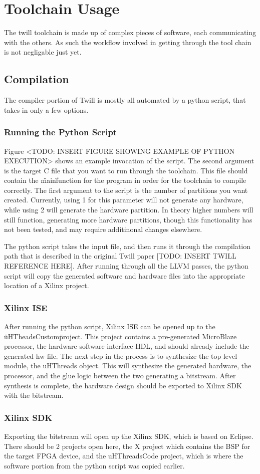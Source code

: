 \chapter{Toolchain Usage}
The twill toolchain is made up of complex pieces of software, each communicating with the others. As such the workflow involved in getting through the tool chain is not negligable just yet.

\section{Compilation}
The compiler portion of Twill is mostly all automated by a python script, that takes in only a few options. 

\subsection{Running the Python Script}
Figure <TODO: INSERT FIGURE SHOWING EXAMPLE OF PYTHON EXECUTION> shows an example invocation of the script. The second argument is the target C file that you want to run through the toolchain. This file should contain the \"main\" function for the program in order for the toolchain to compile correctly. The first argument to the script is the number of partitions you want created. Currently, using 1 for this parameter will not generate any hardware, while using 2 will generate the hardware partition. In theory higher numbers will still function, generating more hardware partitions, though this functionality has not been tested, and may require additinonal changes elsewhere.

The python script takes the input file, and then runs it through the compilation path that is described in the original Twill paper [TODO: INSERT TWILL REFERENCE HERE]. After running through all the LLVM passes, the python script will copy the generated software and hardware files into the appropriate location of a Xilinx project. 

\subsection{Xilinx ISE}
After running the python script, Xilinx ISE can be opened up to the \"uHTheadsCustom\" project. This project contains a pre-generated MicroBlaze processor, the hardware software interface HDL, and should already include the generated hw file. The next step in the process is to synthesize the top level module, the uHThreads object. This will synthesize the generated hardware, the processor, and the glue logic between the two generating a bitstream. After synthesis is complete, the hardware design should be exported to Xilinx SDK with the bitstream.

\subsection{Xilinx SDK}
Exporting the bitstream will open up the Xilinx SDK, which is based on Eclipse. There should be 2 projects open here, the X project which contains the BSP for the target FPGA device, and the uHThreadsCode project, which is where the software portion from the python script was copied earlier. 